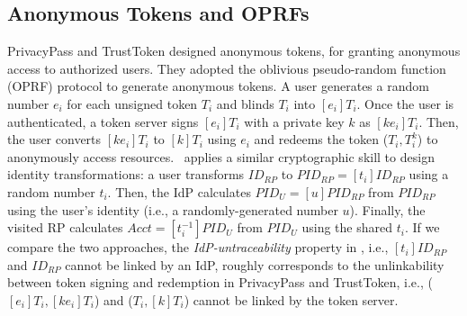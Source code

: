 \subsection{Anonymous Tokens and OPRFs}
\label{sec:related}

%

\newc
PrivacyPass and TrustToken \cite{privacypass,trusttoken} designed anonymous tokens,
    for granting anonymous access to authorized users.
They adopted the oblivious pseudo-random function (OPRF) protocol \cite{oprf-proved,voprf-proved,oprf-bitcoin-wallet} to generate anonymous tokens.
 A user generates a random number $e_i$ for each unsigned token $T_i$ and blinds $T_i$ into $[e_i]T_i$.
Once the user is authenticated, a token server signs $[e_i]T_i$ with a private key $k$ as $[k e_i]T_i$. Then, the user converts $[ke_i]T_i$ to $[k]T_i$ using $e_i$ and redeems the token ($T_i, T_i^k$) to anonymously access resources.
\usso~applies a similar cryptographic skill to design identity transformations: a user transforms $ID_{RP}$ to $PID_{RP} = [t_i]ID_{RP}$ using a random number $t_i$.
Then, the IdP calculates $PID_U = [u]PID_{RP}$ %
from $PID_{RP}$ using the user's identity (i.e., a randomly-generated number $u$).
Finally, the visited RP calculates $Acct = [t_i^{-1}]PID_{U}$ from $PID_{U}$ using the shared $t_i$.
If we compare the two approaches, the \emph{IdP-untraceability} property in \usso, i.e., $[t_i]ID_{RP}$ and $ID_{RP}$ cannot be linked by an IdP, roughly corresponds to
the unlinkability between token signing and redemption in PrivacyPass and TrustToken, i.e., ($[e_i]T_i, [ke_i]T_i$) and  ($T_i, [k]T_i$) cannot be linked by the token server.

